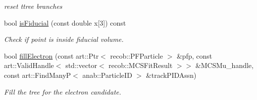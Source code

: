 \begin{DoxyCompactItemize}
\begin{DoxyCompactList}\small\item\em reset ttree branches \end{DoxyCompactList}\item 
bool \hyperlink{classselection_1_1CCincSelection_adf6c627aacf355e0e4c8ff4df5716fee}{is\-Fiducial} (const double x\mbox{[}3\mbox{]}) const 
\begin{DoxyCompactList}\small\item\em Check if point is inside fiducial volume. \end{DoxyCompactList}\item 
bool \hyperlink{classselection_1_1CCincSelection_a7a4360070b68a1877605af180a27b9a8}{fill\-Electron} (const art\-::\-Ptr$<$ recob\-::\-P\-F\-Particle $>$ \&pfp, const art\-::\-Valid\-Handle$<$ std\-::vector$<$ recob\-::\-M\-C\-S\-Fit\-Result $>$$>$ \&M\-C\-S\-Mu\-\_\-handle, const art\-::\-Find\-Many\-P$<$ anab\-::\-Particle\-I\-D $>$ \&track\-P\-I\-D\-Assn)
\begin{DoxyCompactList}\small\item\em Fill the tree for the electron candidate. \end{DoxyCompactList}\end{DoxyCompactItemize}
